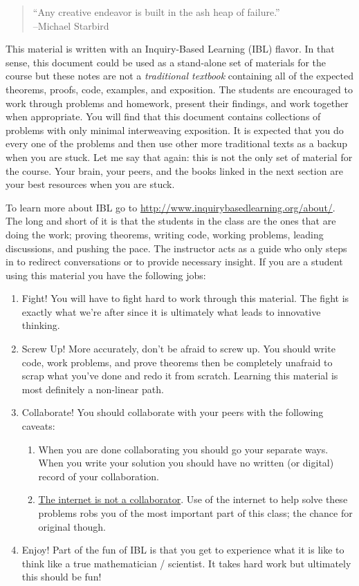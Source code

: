 \begin{quote}
    ``Any creative endeavor is built in the ash heap of failure.'' \\ --Michael Starbird
\end{quote}

This material is written with an Inquiry-Based Learning (IBL) flavor. In that sense, this
document could be used as a stand-alone set of materials for the course but these notes
are not a {\it traditional textbook} containing all of the expected theorems, proofs,
code, examples, and exposition. The students are encouraged to work through problems and
homework, present their findings, and work together when appropriate. You will find that
this document contains collections of problems with only minimal interweaving exposition.
It is expected that you do every one of the problems and then use other more traditional
texts as a backup when you are stuck.  Let me say that again: this is not the only set of
material for the course.  Your brain, your peers, and the books linked in the next section
are your best resources when you are stuck.

To learn more about IBL go to
\href{http://www.inquirybasedlearning.org/about/}{http://www.inquirybasedlearning.org/about/}.
The long and short of it is that the students in the class are the ones that are doing the
work; proving theorems, writing code, working problems, leading discussions, and pushing
the pace. The instructor acts as a guide who only steps in to redirect conversations or to
provide necessary insight. If you are a student using this material you have the following
jobs:
\begin{enumerate}
\item Fight!  You will have to fight hard to work through this material.  The fight is
        exactly what we're after since it is ultimately what leads to innovative thinking.
\item Screw Up!  More accurately, don't be afraid to screw up.  You should write code,
    work problems, and prove theorems then be completely unafraid to scrap what you've
    done and redo it from scratch.  Learning this material is most definitely a non-linear
    path.
\item Collaborate!  You should collaborate with your peers with the following caveats:
    \begin{enumerate}
        \item When you are done collaborating you should go your separate ways.  When you
            write your solution you should have no written (or digital) record of your
            collaboration.  
        \item \underline{The internet is not a collaborator}.  Use of the internet to help
            solve these problems robs you of the most important part of this class; the
            chance for original though.
    \end{enumerate}
\item Enjoy!  Part of the fun of IBL is that you get to experience what it is like to
        think like a true mathematician / scientist.  It takes hard work but ultimately
        this should be fun!
\end{enumerate}

